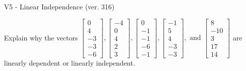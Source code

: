 \begin{exercise}
  \begin{exerciseTitle}V5 - Linear Independence (ver. 316)\end{exerciseTitle}
  \begin{exerciseStatement}
    Explain why the vectors \(\left[\begin{array}{r}
0 \\
4 \\
-3 \\
-3 \\
-6
\end{array}\right] , \left[\begin{array}{r}
-4 \\
0 \\
4 \\
2 \\
3
\end{array}\right] , \left[\begin{array}{r}
0 \\
-1 \\
-1 \\
-6 \\
-1
\end{array}\right] , \left[\begin{array}{r}
-1 \\
5 \\
4 \\
-3 \\
-3
\end{array}\right] , \text{ and } \left[\begin{array}{r}
8 \\
-10 \\
3 \\
17 \\
14
\end{array}\right]\) are linearly dependent or linearly independent.	



\end{exerciseStatement}
\end{exercise}
